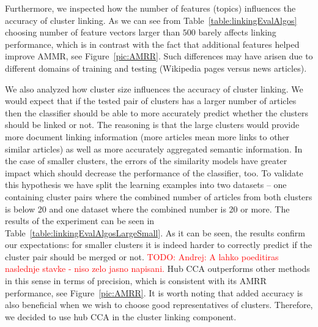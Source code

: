 \documentclass[twoside,11pt]{article}
\newcommand{\todo}[1]{\textcolor{red}{TODO: #1}}
\newcommand{\oldText}[1]{\textcolor{red}{#1:}\color{blue}}
\begin{document}
Furthermore, we inspected how the number of features (topics) influences the accuracy of cluster linking. As we can see from Table~\ref{table:linkingEvalAlgos} choosing number of feature vectors larger than $500$ barely affects linking performance, which is in contrast with the fact that additional features helped improve AMMR, see Figure~\ref{pic:AMRR}. Such differences may have arisen due to different domains of training and testing (Wikipedia pages versus news articles).

We also analyzed how cluster size influences the accuracy of cluster linking. We would expect that if the tested pair of clusters has a larger number of articles then the classifier should be able to more accurately predict whether the clusters should be linked or not. The reasoning is that the large clusters would provide more document linking information (more articles mean more links to other similar articles) as well as more accurately aggregated semantic information. In the case of smaller clusters, the errors of the similarity models have greater impact which should decrease the performance of the classifier, too. To validate this hypothesis we have split the learning examples into two datasets -- one containing cluster pairs where the combined number of articles from both clusters is below 20 and one dataset where the combined number is 20 or more. The results of the experiment can be seen in Table~\ref{table:linkingEvalAlgosLargeSmall}. As it can be seen, the results confirm our expectations: for smaller clusters it is indeed harder to correctly predict if the cluster pair should be merged or not. \todo{Andrej: A lahko poeditiras naslednje stavke - niso zelo jasno napisani.} Hub CCA outperforms other methods in this sense in terms of precision, which is consistent with its AMRR performance, see Figure~\ref{pic:AMRR}.
It is worth noting that added accuracy is also beneficial when we wish to choose good representatives of clusters. Therefore, we decided to use hub CCA in the cluster linking component.

\end{document}

